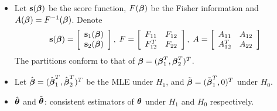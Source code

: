 \documentclass{beamer}
\begin{document}
\begin{frame}{}
\begin{itemize}
\item
Let $\textbf{s}(\mbox{\boldmath $\beta$})$ be the score function, $F(\mbox{\boldmath $\beta$})$ be the Fisher
information and  $A(\mbox{\boldmath $\beta$})=F^{-1}(\mbox{\boldmath $\beta$})$. Denote
$$\textbf{s}(\mbox{\boldmath $\beta$})=\left[\begin{array}{c} \textbf{s}_1(\mbox{\boldmath $\beta$}) \\
\textbf{s}_2(\mbox{\boldmath $\beta$})\end{array}\right], \;
F=\left[\begin{array}{cc} F_{11} & F_{12} \\ F_{12}^T & F_{22}\end{array}\right], \; 
A=\left[\begin{array}{cc} A_{11} & A_{12} \\ A_{12}^T & A_{22}\end{array}\right]$$
The partitions conform to that of $\mbox{\boldmath $\beta$}=
(\mbox{\boldmath $\beta$}_1^T, \mbox{\boldmath $\beta$}_2^T)^T$.
\item
Let $\hat{\mbox{\boldmath $\beta$}}=(\hat{\mbox{\boldmath $\beta$}}_1^T, \hat{\mbox{\boldmath $\beta$}}_2^T)^T$
be the MLE under $H_1$, and $\tilde{\mbox{\boldmath $\beta$}}=(\tilde{\mbox{\boldmath $\beta$}}_1^T,
0)^T$ under $H_0$. 
\item
$\hat{\mbox{\boldmath $\theta$}}$ and
$\tilde{\mbox{\boldmath $\theta$}}$: consistent estimators of $\mbox{\boldmath $\theta$}$ under
$H_1$ and $H_0$ respectively.
\end{itemize}
\end{frame}
\end{document}
